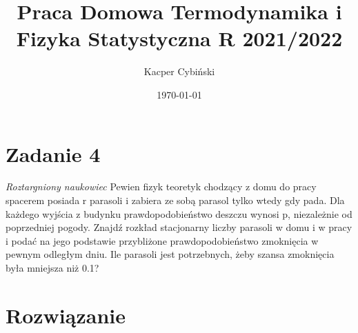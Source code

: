 \documentclass[12pt,a4paper]{article}
\title{Praca Domowa Termodynamika i Fizyka Statystyczna R 2021/2022}
\author{Kacper Cybiński}
\date{\today}
\begin{document}
\maketitle

\section{Zadanie 4}



\textit{Roztargniony naukowiec} 
Pewien fizyk teoretyk chodzący z domu do pracy spacerem posiada r parasoli i zabiera ze sobą parasol tylko wtedy gdy pada. Dla każdego wyjścia z budynku prawdopodobieństwo deszczu wynosi p, niezależnie od poprzedniej pogody. Znajdź rozkład stacjonarny liczby parasoli w domu i w pracy i podać na jego podstawie przybliżone prawdopodobieństwo zmoknięcia w pewnym odległym dniu. Ile parasoli jest potrzebnych, żeby szansa zmoknięcia była mniejsza niż 0.1?



\section{Rozwiązanie}
\end{document}

